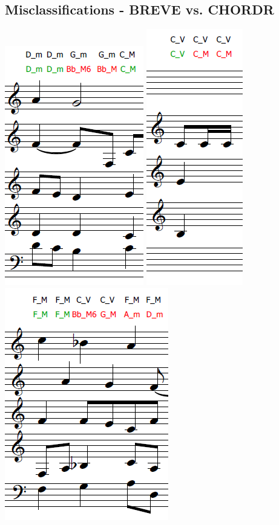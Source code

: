 \documentclass{article} %
\begin{document}
\subsection{Misclassifications - BREVE vs. CHORDR}

\includegraphics[scale=0.5]{relative_error.PNG}
\includegraphics[scale=0.5]{VM_error.PNG}
\includegraphics[scale=0.5]{other_error.PNG}
\end{document}
